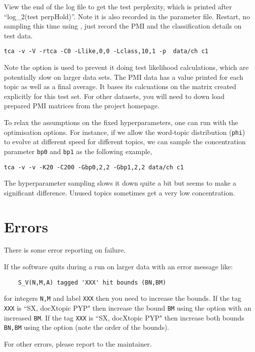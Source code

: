 \documentclass[a4paper,english]{article}
\begin{document}
View the end of the log file to get the test perplexity,
which is printed after ``log\_2(test perpHold)''.
Note it is also recorded in the parameter file.
Restart, no sampling this time using , just record the 
PMI and the classification details on test data.
\begin{verbatim}
tca -v -V -rtca -C0 -Llike,0,0 -Lclass,10,1 -p  data/ch c1
\end{verbatim}

Note the  option is used to prevent it 
doing test likelihood calculations, which are potentially slow
on larger data sets.
The PMI data has a value printed for each topic as well as a 
final average.  It bases its calcuations on the matrix
 created explicitly for this test set.
For other datasets, you will need to down load prepared
PMI matrices from the project homepage.

To relax the assumptions on the fixed hyperparameters, one can run with 
the optimisation options. For instance, if we allow the word-topic distribution (\texttt{phi}) to 
evolve at different speed for different topics, we can sample the concentration parameter \texttt{bp0} and \texttt{bp1} as the following example,
\begin{verbatim}
tca -v -v -K20 -C200 -Gbp0,2,2 -Gbp1,2,2 data/ch c1
\end{verbatim}
The hyperparameter sampling slows it down quite a bit but seems to
make a significant difference.  Unused topics sometimes
get a very low concentration.

\section{Errors}

There is some error reporting on failure.

If the software quits during a run on larger data with an
error message like:
\begin{verbatim}
    S_V(N,M,A) tagged 'XXX' hit bounds (BN,BM)
\end{verbatim}
for integers \texttt{N,M} and label \texttt{XXX} then you
need to increase the bounds.
If the tag \texttt{XXX} is ``SX, docXtopic PYP"
then increase the bound \texttt{BM} using the option
 with an increased \texttt{BM}.
If the tag \texttt{XXX} is ``SX, docXtopic PYP"
then increase both bounds \texttt{BN,BM} using the option
(note the order of the bounds).

For other errors, please report to the
maintainer.
\end{document}
